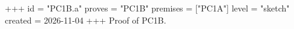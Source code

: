 +++
id = "PC1B.a"
proves = "PC1B"
premises = ["PC1A"]
level = "sketch"
created = 2026-11-04
+++
Proof of PC1B.
